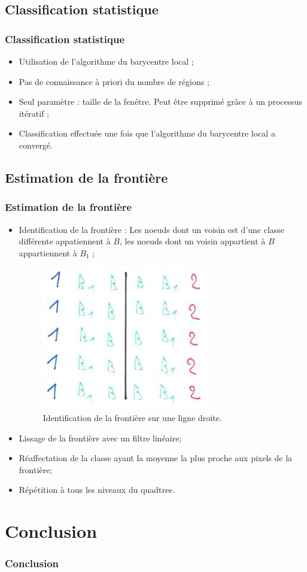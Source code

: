 \documentclass[handout]{beamer}
\begin{document}
		\subsection{Classification statistique}
		\begin{frame}
			\frametitle{Classification statistique}
				\begin{itemize}
					\item Utilisation de l'algorithme du barycentre local ;
					\item Pas de connaissance à priori du nombre de régions ;
					\item Seul paramètre : taille de la fenêtre. Peut être supprimé grâce à un processus itératif ;
					\item Classification effectuée une fois que l’algorithme du barycentre local a convergé.
				\end{itemize}		
		\end{frame}

		\subsection{Estimation de la frontière}
		\begin{frame}
			\frametitle{Estimation de la frontière}
				\begin{itemize}
					\item Identification de la frontière : Les noeuds dont un voisin est d'une classe différente appatiennent à $B$, les noeuds dont un voisin appartient à $B$ appartiennent à $B_1$ ;
					\begin{figure}[H]
						\centering
						\includegraphics[scale=0.19]{images/bordure-3.jpg}
						\caption{Identification de la frontière sur une ligne droite.}
						\label{fig:quadtree2}
					\end{figure}
					\item Lissage de la frontière avec un filtre linéaire;
					\item Réaffectation de la classe ayant la moyenne la plus proche aux pixels de la frontière;
					\item Répétition à tous les niveaux du quadtree.
				\end{itemize}		
		\end{frame}

	\section{Conclusion}

		\begin{frame}
			\frametitle{Conclusion}

		\end{frame}
\end{document}

